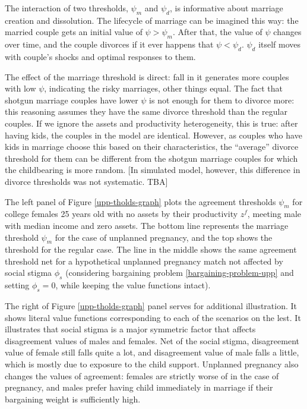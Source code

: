 \documentclass[12pt,letter]{article}
\begin{document}
The interaction of two thresholds, $\psi_m$ and $\psi_d$, is informative about marriage creation and dissolution. The lifecycle of marriage can be imagined this way: the married couple gets an initial value of $\psi > \psi_m$. After that, the value of $\psi$ changes over time, and the couple divorces if it ever happens that $\psi < \psi_d$. $\psi_d$ itself moves with couple's shocks and optimal responses to them. 

The effect of the marriage threshold is direct: fall in it generates more couples with low $\psi$, indicating the risky marriages, other things equal. The fact that shotgun marriage couples have lower $\psi$ is not enough for them to divorce more: this reasoning assumes they have the same divorce threshold than the regular couples. If we ignore the assets and productivity heterogeneity, this is true: after having kids, the couples in the model are identical. However, as couples who have kids in marriage choose this based on their characteristics, the ``average'' divorce threshold for them can be different from the shotgun marriage couples for which the childbearing is more random. [In simulated model, however, this difference in divorce thresholds was not systematic. TBA]

The left panel of Figure \ref{upp-tholds-graph} plots the agreement thresholds $\psi_m$ for college females 25 years old with no assets by their productivity $z^f$, meeting male with median income and zero assets. The bottom line represents the marriage threshold $\psi_m$ for the case of unplanned pregnancy, and the top shows the threshold for the regular case. The line in the middle shows the same agreement threshold net for a hypothetical unplanned pregnancy match not affected by social stigma $\phi_s$ (considering bargaining problem \ref{bargaining-problem-upp} and setting $\phi_s = 0$, while keeping the value functions intact). 

The right of Figure \ref{upp-tholds-graph} panel serves for additional illustration. It shows literal value functions corresponding to each of the scenarios on the lest. It illustrates that social stigma is a major symmetric factor that affects disagreement values of males and females. Net of the social stigma, disagreement value of female still falls quite a lot, and disagreement value of male falls a little, which is mostly due to exposure to the child support. Unplanned pregnancy also changes the values of agreement: females are strictly worse of in the case of pregnancy, and males prefer having child immediately in marriage if their bargaining weight is sufficiently high.
\end{document}
